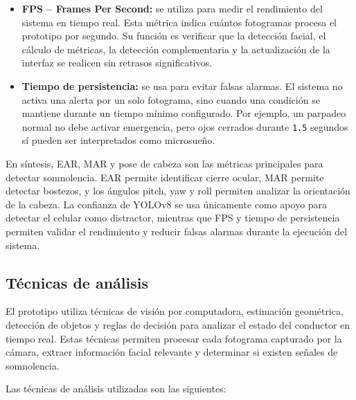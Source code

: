 \documentclass[conference]{IEEEtran}
\begin{document}
\begin{itemize}
    \item \textbf{FPS -- Frames Per Second:} se utiliza para medir el rendimiento del sistema en tiempo real. Esta métrica indica cuántos fotogramas procesa el prototipo por segundo. Su función es verificar que la detección facial, el cálculo de métricas, la detección complementaria y la actualización de la interfaz se realicen sin retrasos significativos.

    \item \textbf{Tiempo de persistencia:} se usa para evitar falsas alarmas. El sistema no activa una alerta por un solo fotograma, sino cuando una condición se mantiene durante un tiempo mínimo configurado. Por ejemplo, un parpadeo normal no debe activar emergencia, pero ojos cerrados durante \texttt{1.5} segundos sí pueden ser interpretados como microsueño.
\end{itemize}

En síntesis, EAR, MAR y pose de cabeza son las métricas principales para detectar somnolencia. EAR permite identificar cierre ocular, MAR permite detectar bostezos, y los ángulos pitch, yaw y roll permiten analizar la orientación de la cabeza. La confianza de YOLOv8 se usa únicamente como apoyo para detectar el celular como distractor, mientras que FPS y tiempo de persistencia permiten validar el rendimiento y reducir falsas alarmas durante la ejecución del sistema.


\subsection{Técnicas de análisis}

El prototipo utiliza técnicas de visión por computadora, estimación geométrica, detección de objetos y reglas de decisión para analizar el estado del conductor en tiempo real. Estas técnicas permiten procesar cada fotograma capturado por la cámara, extraer información facial relevante y determinar si existen señales de somnolencia.

Las técnicas de análisis utilizadas son las siguientes:
\end{document}
